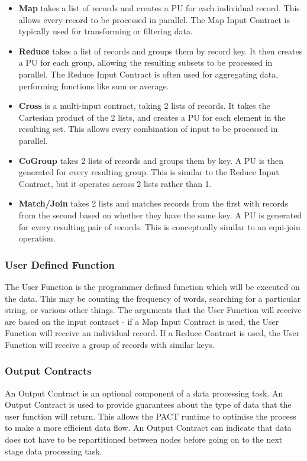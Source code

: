 \begin{itemize}
    \item \textbf{Map} takes a list of records and creates a PU for each individual record. This allows every record to be processed in parallel. The Map Input Contract is typically used for transforming or filtering data.
    \item \textbf{Reduce} takes a list of records and groups them by record key. It then creates a PU for each group, allowing the resulting subsets to be processed in parallel. The Reduce Input Contract is often used for aggregating data, performing functions like sum or average.
    \item \textbf{Cross} is a multi-input contract, taking 2 lists of records. It takes the Cartesian product of the 2 lists, and creates a PU for each element in the resulting set. This allows every combination of input to be processed in parallel.
    \item \textbf{CoGroup} takes 2 lists of records and groups them by key. A PU is then generated for every resulting group. This is similar to the Reduce Input Contract, but it operates across 2 lists rather than 1.
    \item \textbf{Match/Join} takes 2 lists and matches records from the first with records from the second based on whether they have the same key. A PU is generated for every resulting pair of records. This is conceptually similar to an equi-join operation.
\end{itemize}

\subsubsection{User Defined Function}
The User Function is the programmer defined function which will be executed on the data. This may be counting the frequency of words, searching for a particular string, or various other things. The arguments that the User Function will receive are based on the input contract - if a Map Input Contract is used, the User Function will receive an individual record. If a Reduce Contract is used, the User Function will receive a group of records with similar keys.

\subsubsection{Output Contracts}
An Output Contract is an optional component of a data processing task. An Output Contract is used to provide guarantees about the type of data that the user function will return. This allows the PACT runtime to optimise the process to make a more efficient data flow. An Output Contract can indicate that data does not have to be repartitioned between nodes before going on to the next stage data processing task. 

